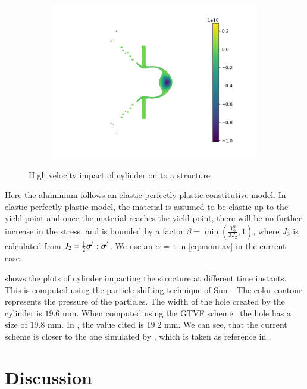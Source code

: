 \begin{figure}
\begin{subfigure}{0.3\textwidth}
    \includegraphics[width=1.0\textwidth]{figures/ctvf/figures/high_velocity_impact/etvf_sun2019/time8}
    \label{}
  \end{subfigure}
  \caption{High velocity impact of cylinder on to a structure}
\label{fig:hvi:etvf-sun2019}
\end{figure}
Here the aluminium follows an elastic-perfectly plastic constitutive model. In
elastic perfectly plastic model, the material is assumed to be elastic up to
the yield point and once the material reaches the yield point, there will be
no further increase in the stress, and is bounded by a factor
$\beta = \min\left(\frac{Y_0^2}{3J_2}, 1 \right)$, where $J_2$ is calculated
from $J_2 = \frac{1}{2} \boldsymbol{\sigma}^{'} : \boldsymbol{\sigma}^{'}$. We use an
$\alpha=1$ in \cref{eq:mom-av} in the current case.

 shows the plots of cylinder impacting the
structure at different time instants. This is computed using the particle
shifting technique of Sun~\citep{sun_consistent_2019}. The color contour
represents the pressure of the particles. The width of the hole created by the
cylinder is $19.6$ mm. When computed using the GTVF
scheme~\citep{zhang_hu_adams17} the hole has a size of $19.8$ mm. In
\cite{howell2002free}, the value cited is $19.2$ mm. We can see, that the
current scheme is closer to the one simulated by \citep{howell2002free}, which
is taken as reference in \citep{zhang_hu_adams17}.


\section{Discussion}

